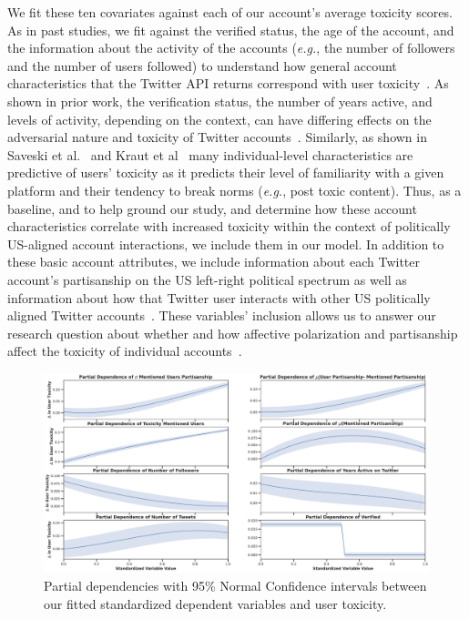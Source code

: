 \noindent We fit these ten covariates against each of our account's average toxicity scores. As in past studies, we fit against the verified status, the age of the account, and the information about the activity of the accounts (\textit{e.g.}, the number of followers and the number of users followed)  to understand how general account characteristics that the Twitter API returns correspond with user toxicity~\cite{hua2020characterizing, chatzakou2017measuring}. As shown in prior work, the verification status, the number of years active, and levels of activity, depending on the context, can have differing effects on the adversarial nature and toxicity of Twitter accounts~\cite{chatzakou2017measuring,ribeiro2018characterizing}. Similarly, as shown in Saveski et al.~\cite{saveski2021structure} and Kraut et al~\cite{kraut2010dealing}  many individual-level characteristics are predictive of users' toxicity as it predicts their level of familiarity with a given platform and their tendency to break norms (\textit{e.g.}, post toxic content).  Thus, as a baseline, and to help ground our study, and determine how these account characteristics correlate with increased toxicity within the context of politically US-aligned account interactions, we include them in our model. In addition to these basic account attributes, we include information about each Twitter account's partisanship on the US left-right political spectrum as well as information about how that Twitter user interacts with other US politically aligned Twitter accounts~\cite{marozzo2018analyzing}. These variables' inclusion allows us to answer our research question about whether and how affective polarization and partisanship affect the toxicity of individual accounts~\cite{kubin2021role}.


\begin{figure}
\begin{minipage}[l]{1.0\textwidth}
\includegraphics[width=1\columnwidth]{figures/partial_dependence_important_variables.pdf} 
\end{minipage}
\begin{minipage}[l]{1\textwidth}
\caption{Partial dependencies with 95\% Normal Confidence intervals between our fitted standardized dependent variables and user toxicity.}
\label{fig:partial-dependence-user-toxcity}
\end{minipage}

\end{figure}


